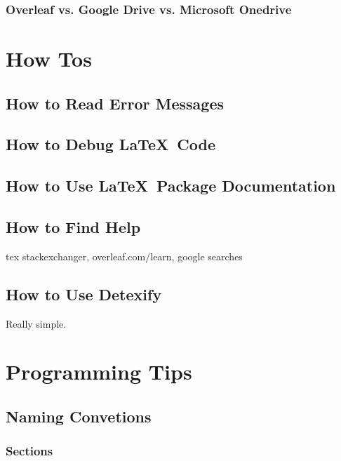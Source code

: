 \documentclass[12pt]{article}
\begin{document}
\subsubsection{Overleaf vs. Google Drive vs. Microsoft Onedrive}%
\label{feat-comp.table.collab-solns}

\section{How Tos}%
\label{how-to}

\subsection{How to Read Error Messages}%
\label{how-to.error-messages}

\subsection{How to Debug \LaTeX\ Code}%
\label{how-to.debug}

\subsection{How to Use \LaTeX\ Package Documentation}%
\label{how-to.package-docs}

\subsection{How to Find Help}%
\label{how-to.help}

tex stackexchanger, overleaf.com/learn, google searches

\subsection{How to Use Detexify}%
\label{how-to.detexify}

Really simple.

\section{Programming Tips}%
\label{tips}

\subsection{Naming Convetions}%
\label{tips.name-convs}

\subsubsection{Sections}%
\label{tips.name-convs.sections}
\end{document}
